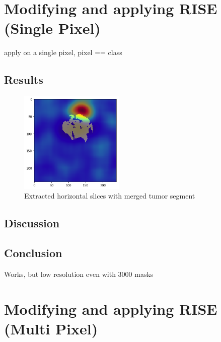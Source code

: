 \section{Modifying and applying RISE (Single Pixel)}

apply on a single pixel, pixel == class

\subsection{Results}

\begin{figure}[H]
\centering
\includegraphics[width=5cm]{chapters/04_segmentation/images/rise_single_pixel.png}
\caption{Extracted horizontal slices with merged tumor segment}
\end{figure}



\subsection{Discussion}

\subsection{Conclusion}
Works, but low resolution even with 3000 masks

\section{Modifying and applying RISE (Multi Pixel)}


